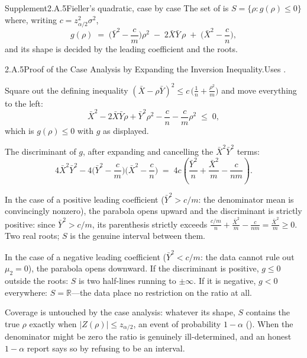 \documentclass[main.tex]{subfiles}
\begin{document}
\begin{ObjL}{Supplement}{2.A.5}{Fieller's quadratic, case by case}
The set of  is $S=\{\rho: g(\rho)\le 0\}$ where, writing
$c=z_{\alpha/2}^2\sigma^2$,
\[ g(\rho) \;=\; \Big(\bar Y^2-\frac{c}{m}\Big)\rho^2 \;-\; 2\bar X\bar Y\,\rho
   \;+\; \Big(\bar X^2-\frac{c}{n}\Big) , \]
and its shape is decided by the leading coefficient and the roots.
\end{ObjL}
\begin{Prf}{2.A.5}{Proof of the Case Analysis by Expanding the Inversion Inequality.}{Uses .}
\item Square out the defining inequality
      $(\bar X-\rho\bar Y)^2 \le c\,\big(\frac1n+\frac{\rho^2}{m}\big)$ and move everything
      to the left:
      \[ \bar X^2 - 2\bar X\bar Y \rho + \bar Y^2\rho^2 - \frac{c}{n}
         - \frac{c}{m}\rho^2 \;\le\; 0 , \]
      which is $g(\rho)\le0$ with $g$ as displayed.
\item The discriminant of $g$, after expanding and cancelling the $\bar X^2\bar Y^2$
      terms:
      \[ 4\bar X^2\bar Y^2 - 4\Big(\bar Y^2-\frac{c}{m}\Big)\Big(\bar X^2-\frac{c}{n}\Big)
         \;=\; 4c\left( \frac{\bar Y^2}{n} + \frac{\bar X^2}{m} - \frac{c}{nm} \right) . \]
\item In the case of a positive leading coefficient ($\bar Y^2>c/m$: the denominator mean
      is convincingly nonzero), the parabola opens upward and the discriminant is strictly
      positive: since $\bar Y^2>c/m$, its parenthesis strictly exceeds
      $\frac{c/m}{n}+\frac{\bar X^2}{m}-\frac{c}{nm}=\frac{\bar X^2}{m}\ge0$. Two real
      roots; $S$ is the genuine interval between them.
\item In the case of a negative leading coefficient ($\bar Y^2<c/m$: the data cannot rule
      out $\mu_2=0$), the parabola opens downward. If the discriminant is positive, $g\le0$
      outside the roots: $S$ is two half-lines running to $\pm\infty$. If it is negative,
      $g<0$ everywhere: $S=\mathbb{R}$---the data place no restriction on the ratio at all.
\item Coverage is untouched by the case analysis: whatever its shape, $S$ contains the true
      $\rho$ exactly when $|Z(\rho)|\le z_{\alpha/2}$, an event of probability $1-\alpha$
      (). When the denominator might be zero the ratio is genuinely
      ill-determined, and an honest $1-\alpha$ report says so by refusing to be an
      interval.
\end{Prf}

\ifSubfilesClassLoaded{\clearpage\objindex}{}
\end{document}
